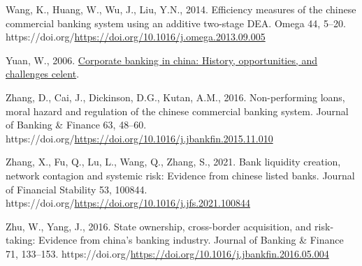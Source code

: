 \documentclass[
  12pt,
  a4paper,
]{scrreprt}
\newlength{\cslhangindent}
\newenvironment{CSLReferences}[2] %
 {\begin{list}{}{%
  \setlength{\itemindent}{0pt}
  \setlength{\leftmargin}{0pt}
  \setlength{\parsep}{0pt}
  \ifodd #1
   \setlength{\leftmargin}{\cslhangindent}
   \setlength{\itemindent}{-1\cslhangindent}
  \fi
  \setlength{\itemsep}{#2\baselineskip}}}
 {\end{list}}
\begin{document}
\begin{CSLReferences}{1}{0}
Wang, K., Huang, W., Wu, J., Liu, Y.N., 2014. Efficiency measures of the
chinese commercial banking system using an additive two-stage DEA. Omega
44, 5--20.
https://doi.org/\url{https://doi.org/10.1016/j.omega.2013.09.005}

Yuan, W., 2006.
\href{https://www.celent.com/insights/314000619}{Corporate banking in
china: History, opportunities, and challenges \textbar{} celent}.

Zhang, D., Cai, J., Dickinson, D.G., Kutan, A.M., 2016. Non-performing
loans, moral hazard and regulation of the chinese commercial banking
system. Journal of Banking \& Finance 63, 48--60.
https://doi.org/\url{https://doi.org/10.1016/j.jbankfin.2015.11.010}

Zhang, X., Fu, Q., Lu, L., Wang, Q., Zhang, S., 2021. Bank liquidity
creation, network contagion and systemic risk: Evidence from chinese
listed banks. Journal of Financial Stability 53, 100844.
https://doi.org/\url{https://doi.org/10.1016/j.jfs.2021.100844}

Zhu, W., Yang, J., 2016. State ownership, cross-border acquisition, and
risk-taking: Evidence from china's banking industry. Journal of Banking
\& Finance 71, 133--153.
https://doi.org/\url{https://doi.org/10.1016/j.jbankfin.2016.05.004}

\end{CSLReferences}
\end{document}
